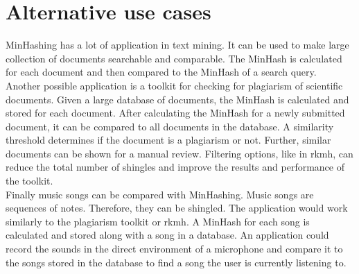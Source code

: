 \section{Alternative use cases}

MinHashing has a lot of application in text mining. It can be used to make large collection of documents searchable and comparable. The MinHash is calculated for each document and then compared to the MinHash of a search query.\\

Another possible application is a toolkit for checking for plagiarism of scientific documents. Given a large database of documents, the MinHash is calculated and stored for each document. After calculating the MinHash for a newly submitted document, it can be compared to all documents in the database. A similarity threshold determines if the document is a plagiarism or not. Further, similar documents can be shown for a manual review. Filtering options, like in rkmh, can reduce the total number of shingles and improve the results and performance of the toolkit.\\

Finally music songs can be compared with MinHashing. Music songs are sequences of notes. Therefore, they can be shingled. The application would work similarly to the plagiarism toolkit or rkmh. A MinHash for each song is calculated and stored along with a song in a database. An application could record the sounds in the direct environment of a microphone and compare it to the songs stored in the database to find a song the user is currently listening to.\\